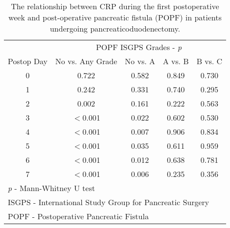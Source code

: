 \begin{table}[h]
	\centering
	\caption{The relationship between CRP during the first postoperative week and post-operative pancreatic fistula (POPF) in patients undergoing pancreaticoduodenectomy.}
	\label{table:crp_comp_vs_POPF_ISGPS_p_values_only}
	\renewcommand{\arraystretch}{1.2} %
	\begin{tabular}{| c | c c c c |}
		\hline
		           &       \multicolumn{4}{c|}{POPF ISGPS Grades - \textit{p}}        \\
		Postop Day & No vs. Any Grade & No vs. A & A vs. B & B vs. C                 \\ \hline
		0          & 0.722            & 0.582    & 0.849   & 0.730                   \\
		1          & 0.242            & 0.331    & 0.740   & 0.295                   \\
		2          & 0.002            & 0.161    & 0.222   & 0.563                   \\
		3          & $<$0.001         & 0.022    & 0.602   & 0.530                   \\
		4          & $<$0.001         & 0.007    & 0.906   & 0.834                   \\
		5          & $<$0.001         & 0.035    & 0.611   & 0.959                   \\
		6          & $<$0.001         & 0.012    & 0.638   & 0.781                   \\
		7          & $<$0.001         & 0.006    & 0.235   & 0.356                   \\ \hline
		\multicolumn{5}{l}{\textit{p} - Mann-Whitney U test}                         \\
		\multicolumn{5}{l}{ISGPS - International Study Group for Pancreatic Surgery}	\\
				\multicolumn{5}{l}{POPF - Postoperative Pancreatic Fistula}
	\end{tabular}
	
	
\end{table}